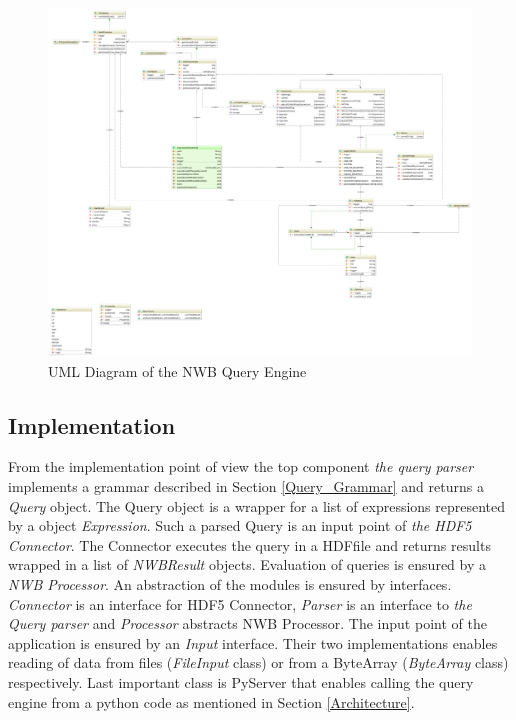 \documentclass[utf8]{frontiersSCNS} %
\begin{document}
\begin{figure}
  \includegraphics[width=17cm]{diagram}
\caption{UML Diagram of the NWB Query Engine}
\label{fig:diagram}
\end{figure}


\subsection{Implementation}
\label{Implementation}

From the implementation point of view the top component \emph{the query parser} implements a grammar described in Section \ref{Query_Grammar} and returns a \emph{Query} object. The Query object is a wrapper for a list of expressions represented by a object \emph{Expression}. Such a parsed Query is an input point of \emph{the HDF5 Connector}. The Connector executes the query in a HDFfile and returns results wrapped in a list of \emph{NWBResult} objects. Evaluation of queries is ensured by a \emph{NWB Processor}. An abstraction of the modules is ensured by interfaces. \emph{Connector} is an interface for HDF5 Connector, \emph{Parser} is an interface to \emph{the Query parser} and \emph{Processor} abstracts NWB Processor. The input point of the application is ensured by an \emph{Input} interface. Their two implementations enables reading of data from files (\emph{FileInput} class) or from a ByteArray (\emph{ByteArray} class) respectively. Last important class is PyServer that enables calling the query engine from a python code as mentioned in Section \ref{Architecture}.
\end{document}

